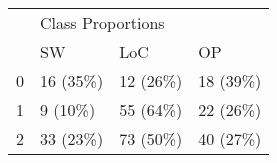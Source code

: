 \begin{tabular}{llll}
\toprule
{} & \multicolumn{3}{l}{Class Proportions} \\
{} &                SW &       LoC &        OP \\
\midrule
0 &          16 (35\%) &  12 (26\%) &  18 (39\%) \\
1 &           9 (10\%) &  55 (64\%) &  22 (26\%) \\
2 &          33 (23\%) &  73 (50\%) &  40 (27\%) \\
\bottomrule
\end{tabular}
